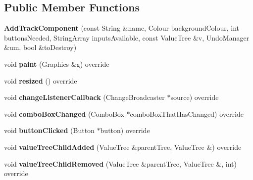 \subsection*{Public Member Functions}
\begin{DoxyCompactItemize}
\item 
\mbox{\label{class_add_track_component_af2fb1e2c563abb0f8823daf1ae513f38}} 
{\bfseries Add\+Track\+Component} (const String \&name, Colour background\+Colour, int buttons\+Needed, String\+Array inputs\+Available, const Value\+Tree \&v, Undo\+Manager \&um, bool \&to\+Destroy)
\item 
\mbox{\label{class_add_track_component_a31fa580e34614a965b7977759df09b79}} 
void {\bfseries paint} (Graphics \&g) override
\item 
\mbox{\label{class_add_track_component_a6d3f13028cb0ea1ee54801bb673c1278}} 
void {\bfseries resized} () override
\item 
\mbox{\label{class_add_track_component_a39d72dc581c242cee61e098bff0e9080}} 
void {\bfseries change\+Listener\+Callback} (Change\+Broadcaster $\ast$source) override
\item 
\mbox{\label{class_add_track_component_a1e82e5894028dc1ea1bf7ac029957b83}} 
void {\bfseries combo\+Box\+Changed} (Combo\+Box $\ast$combo\+Box\+That\+Has\+Changed) override
\item 
\mbox{\label{class_add_track_component_aa50733ce5221af36c6ef411a39f0782f}} 
void {\bfseries button\+Clicked} (Button $\ast$button) override
\item 
\mbox{\label{class_add_track_component_a5316ba379b212eeb5e95ebb5d91b8947}} 
void {\bfseries value\+Tree\+Child\+Added} (Value\+Tree \&parent\+Tree, Value\+Tree \&) override
\item 
\mbox{\label{class_add_track_component_a66d7bfccf52654f675bb02436e3c466d}} 
void {\bfseries value\+Tree\+Child\+Removed} (Value\+Tree \&parent\+Tree, Value\+Tree \&, int) override
\item 

\end{DoxyCompactItemize}
